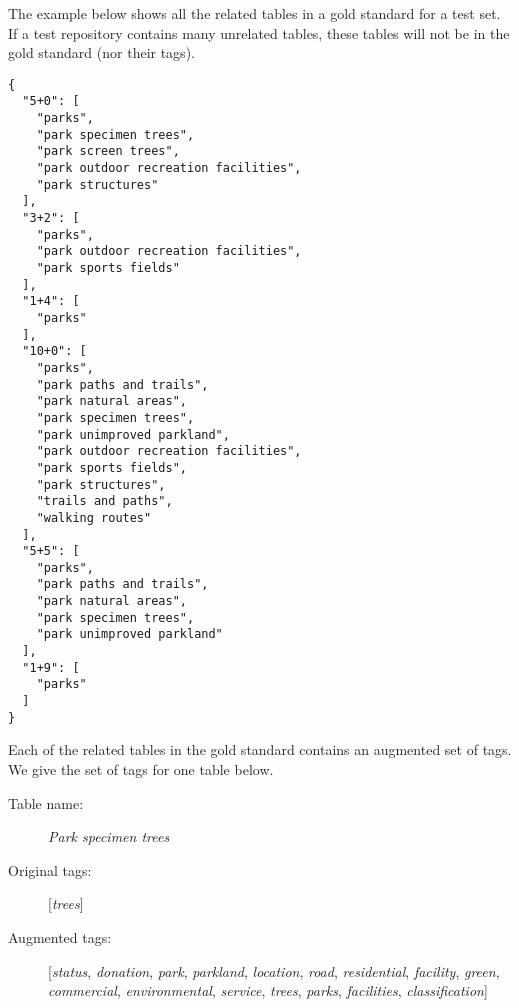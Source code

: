 The example below shows all the related tables in a gold standard for a test set. If a test repository contains many unrelated tables, these tables will not be in the gold standard (nor their tags).
\begin{lstlisting}
{
  "5+0": [
    "parks",
    "park specimen trees",
    "park screen trees",
    "park outdoor recreation facilities",
    "park structures"
  ],
  "3+2": [
    "parks",
    "park outdoor recreation facilities",
    "park sports fields"
  ],
  "1+4": [
    "parks"
  ],
  "10+0": [
    "parks",
    "park paths and trails",
    "park natural areas",
    "park specimen trees",
    "park unimproved parkland",
    "park outdoor recreation facilities",
    "park sports fields",
    "park structures",
    "trails and paths",
    "walking routes"
  ],
  "5+5": [
    "parks",
    "park paths and trails",
    "park natural areas",
    "park specimen trees",
    "park unimproved parkland"
  ],
  "1+9": [
    "parks"
  ]
}
\end{lstlisting}

Each of the related tables in the gold standard contains an augmented set of tags. We give the set of tags for one table below.

\begin{description}
\item[Table name:]\textit{Park specimen trees}
\item[Original tags:][\textit{trees}]
\item[Augmented tags:][\textit{status}, \textit{donation}, \textit{park}, \textit{parkland}, \textit{location}, \textit{road}, \textit{residential}, \textit{facility}, \textit{green}, \textit{commercial}, \textit{environmental}, \textit{service}, \textit{trees}, \textit{parks}, \textit{facilities}, \textit{classification}]
\end{description}
\endinput